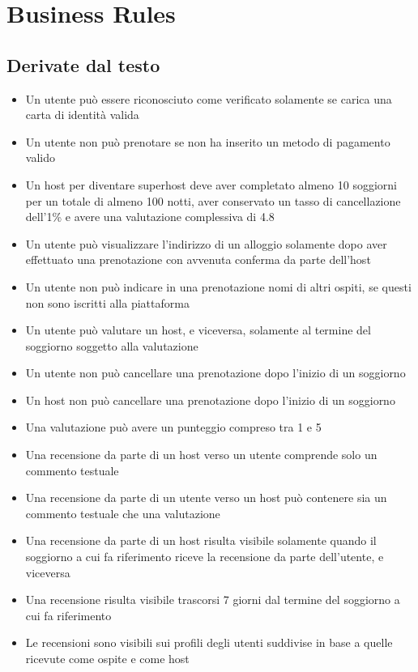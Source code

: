 \section{Business Rules}
\subsection{Derivate dal testo}
\begin{itemize}
  \item Un utente può essere riconosciuto come verificato solamente se carica una carta di identità valida
  \item Un utente non può prenotare se non ha inserito un metodo di pagamento valido
  \item Un host per diventare superhost deve aver completato almeno 10 soggiorni per un totale di almeno 100 notti, aver conservato un tasso di cancellazione dell'1\% e avere una valutazione complessiva di 4.8 
  \item Un utente può visualizzare l'indirizzo di un alloggio solamente dopo aver effettuato una prenotazione con avvenuta conferma da parte dell'host
  \item Un utente non può indicare in una prenotazione nomi di altri ospiti, se questi non sono iscritti alla piattaforma 
  \item Un utente può valutare un host, e viceversa, solamente al termine del soggiorno soggetto alla valutazione
  \item Un utente non può cancellare una prenotazione dopo l'inizio di un soggiorno
  \item Un host non può cancellare una prenotazione dopo l'inizio di un soggiorno
  \item Una valutazione può avere un punteggio compreso tra 1 e 5
  \item Una recensione da parte di un host verso un utente comprende solo un commento testuale
  \item Una recensione da parte di un utente verso un host può contenere sia un commento testuale che una valutazione
  \item Una recensione da parte di un host risulta visibile solamente quando il soggiorno a cui fa riferimento riceve la recensione da parte dell'utente, e viceversa
  \item Una recensione risulta visibile trascorsi 7 giorni dal termine del soggiorno a cui fa riferimento
  \item Le recensioni sono visibili sui profili degli utenti suddivise in base a quelle ricevute come ospite e come host
\end{itemize}

